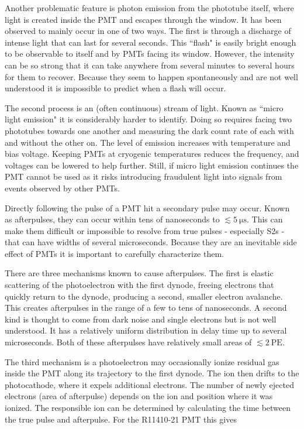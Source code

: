 Another problematic feature is photon emission from the phototube itself, where light is created inside the PMT and escapes through the
window.  It has been observed to mainly occur in one of two ways.  The first is through a discharge of intense light that can last for
several seconds.  This ``flash" is easily bright enough to be observable to itself and by PMTs facing its
window.  However, the intensity can be so strong that it can take anywhere from several minutes to several hours for them to
recover.  Because they seem to happen spontaneously and are not well understood it is impossible to predict when a flash will occur.

The second process is an (often continuous) stream of light.  Known as ``micro light emission" it is considerably harder to
identify.  Doing so requires facing two phototubes towards one another and measuring the dark count rate of each with and without the
other
on.  The level of emission increases with temperature and bias voltage.  Keeping PMTs at cryogenic temperatures reduces
the frequency, and voltages can be lowered to help further.  Still, if micro light emission continues the PMT cannot be used as it risks
introducing fraudulent light into signals from events observed by other PMTs.

Directly following the pulse of a PMT hit a secondary pulse may occur.  Known as afterpulses, they can occur within tens of nanoseconds to
$\lesssim 5\ \mathrm{\mu s}$.  This can make them difficult or impossible to resolve from true pulses - especially S2s - that can have
widths of several
microseconds.  Because they are an inevitable side effect of PMTs it is important to carefully characterize them.

There are three mechanisms known to cause afterpulses.  The first is elastic scattering of the photoelectron with the first dynode,
freeing electrons that quickly return to the dynode, producing a second, smaller electron avalanche.  This
creates afterpulses in the range of a few to tens of nanoseconds.  A second kind is thought to come
from dark noise and single electrons but is not well understood.  It has a relatively uniform distribution in delay time up to several
microseconds.  Both of these afterpulses have relatively small areas of $\lesssim 2\ \mathrm{PE}$.

The third mechanism is a photoelectron may occasionally ionize residual gas inside the PMT along its trajectory to the first dynode.  The
ion then drifts
to the photocathode, where it expels additional electrons.  The number of newly ejected electrons (area of afterpulse) depends
on the ion and position where it was ionized.  The responsible ion can be determined by calculating the time between the true pulse and
afterpulse.  For the R11410-21 PMT this gives

